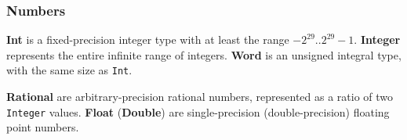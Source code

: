 %

\subsubsection{Numbers}
\textbf{Int} is a fixed-precision integer type with at least the range $-2^{29} .. 2^{29}-1$.
\textbf{Integer} represents the entire infinite range of integers.
\textbf{Word} is an unsigned integral type, with the same size as \texttt{Int}.

\textbf{Rational} are arbitrary-precision rational numbers, represented as a ratio of two \texttt{Integer} values.
\textbf{Float} (\textbf{Double}) are single-precision (double-precision) floating point numbers.

%
